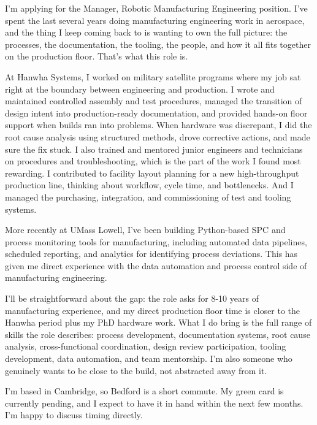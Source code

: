 \documentclass[letterpaper,11pt]{moderncv}
\date{\today}
\begin{document}
\makelettertitle

I'm applying for the Manager, Robotic Manufacturing Engineering position. I've spent the last several years doing manufacturing engineering work in aerospace, and the thing I keep coming back to is wanting to own the full picture: the processes, the documentation, the tooling, the people, and how it all fits together on the production floor. That's what this role is.

At Hanwha Systems, I worked on military satellite programs where my job sat right at the boundary between engineering and production. I wrote and maintained controlled assembly and test procedures, managed the transition of design intent into production-ready documentation, and provided hands-on floor support when builds ran into problems. When hardware was discrepant, I did the root cause analysis using structured methods, drove corrective actions, and made sure the fix stuck. I also trained and mentored junior engineers and technicians on procedures and troubleshooting, which is the part of the work I found most rewarding. I contributed to facility layout planning for a new high-throughput production line, thinking about workflow, cycle time, and bottlenecks. And I managed the purchasing, integration, and commissioning of test and tooling systems.

More recently at UMass Lowell, I've been building Python-based SPC and process monitoring tools for manufacturing, including automated data pipelines, scheduled reporting, and analytics for identifying process deviations. This has given me direct experience with the data automation and process control side of manufacturing engineering.

I'll be straightforward about the gap: the role asks for 8-10 years of manufacturing experience, and my direct production floor time is closer to the Hanwha period plus my PhD hardware work. What I do bring is the full range of skills the role describes: process development, documentation systems, root cause analysis, cross-functional coordination, design review participation, tooling development, data automation, and team mentorship. I'm also someone who genuinely wants to be close to the build, not abstracted away from it.

I'm based in Cambridge, so Bedford is a short commute. My green card is currently pending, and I expect to have it in hand within the next few months. I'm happy to discuss timing directly.

\makeletterclosing
\end{document}
